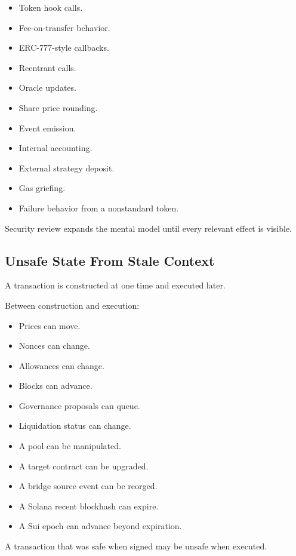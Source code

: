 \begin{itemize}
\tightlist
\item
  Token hook calls.
\item
  Fee-on-transfer behavior.
\item
  ERC-777-style callbacks.
\item
  Reentrant calls.
\item
  Oracle updates.
\item
  Share price rounding.
\item
  Event emission.
\item
  Internal accounting.
\item
  External strategy deposit.
\item
  Gas griefing.
\item
  Failure behavior from a nonstandard token.
\end{itemize}

Security review expands the mental model until every relevant effect is
visible.

\subsection{Unsafe State From Stale Context}

A transaction is constructed at one time and executed later.

Between construction and execution:

\begin{itemize}
\tightlist
\item
  Prices can move.
\item
  Nonces can change.
\item
  Allowances can change.
\item
  Blocks can advance.
\item
  Governance proposals can queue.
\item
  Liquidation status can change.
\item
  A pool can be manipulated.
\item
  A target contract can be upgraded.
\item
  A bridge source event can be reorged.
\item
  A Solana recent blockhash can expire.
\item
  A Sui epoch can advance beyond expiration.
\end{itemize}

A transaction that was safe when signed may be unsafe when executed.

